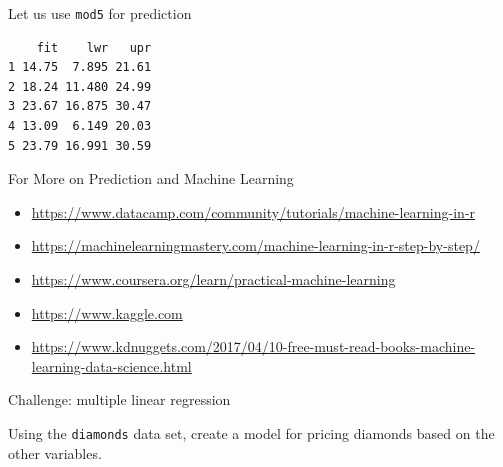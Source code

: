 \begin{frame}[fragile]{Let us use \texttt{mod5} for prediction}

\begin{Shaded}
\begin{Highlighting}[]
\StringTok{ }\NormalTok{(} \OperatorTok{$}\NormalTok{) }\OperatorTok{+}\StringTok{ }\NormalTok{(}\NormalTok{))}
\NormalTok{)}
\end{Highlighting}
\end{Shaded}

\begin{verbatim}
    fit    lwr   upr
1 14.75  7.895 21.61
2 18.24 11.480 24.99
3 23.67 16.875 30.47
4 13.09  6.149 20.03
5 23.79 16.991 30.59
\end{verbatim}

\end{frame}

\begin{frame}{For More on Prediction and Machine Learning}

\begin{itemize}
\tightlist
\item
  \url{https://www.datacamp.com/community/tutorials/machine-learning-in-r}
\item
  \url{https://machinelearningmastery.com/machine-learning-in-r-step-by-step/}
\item
  \url{https://www.coursera.org/learn/practical-machine-learning}
\item
  \url{https://www.kaggle.com}
\item
  \url{https://www.kdnuggets.com/2017/04/10-free-must-read-books-machine-learning-data-science.html}
\end{itemize}

\end{frame}

\begin{frame}[fragile]{Challenge: multiple linear regression}

Using the \texttt{diamonds} data set, create a model for pricing
diamonds based on the other variables.

\begin{Shaded}
\begin{Highlighting}[]
\end{Highlighting}
\end{Shaded}

\end{frame}

